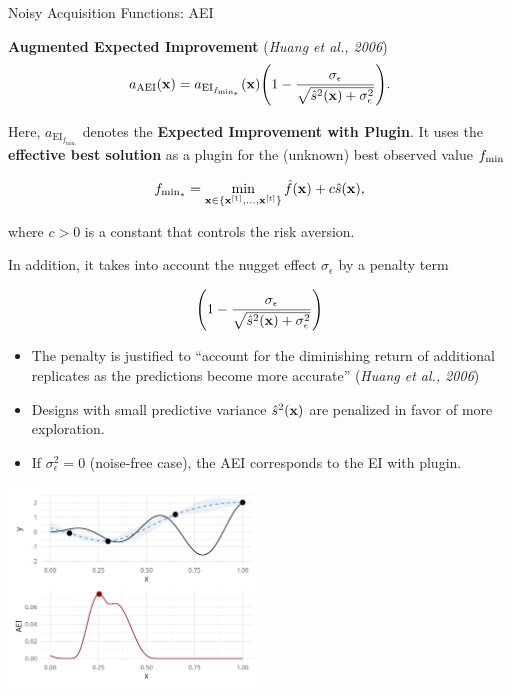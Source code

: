 \documentclass[11pt,compress,t,notes=noshow, xcolor=table]{beamer}
\begin{document}
\begin{vbframe}{Noisy Acquisition Functions: AEI}


\textbf{Augmented Expected Improvement} (\emph{Huang et al., 2006})
$$
  a_{\text{AEI}}(\mathbf{x}) = a_{\text{EI}_{f_{\min_*}}}(\mathbf{x}) \Bigg(1- \frac{\sigma_\epsilon}{\sqrt{\hat{s}^2(\mathbf{x})+ \sigma_\epsilon^2}}\Bigg).
$$

Here, $a_{\text{EI}_{f_{\min_*}}}$ denotes the \textbf{Expected Improvement with Plugin}.
It uses the \textbf{effective best solution} as a plugin for the (unknown) best observed value $f_{\min}$

$$
  f_{\min_*} = \min_{\mathbf{x} \in \{\mathbf{x}^{[1]}, ..., \mathbf{x}^{[t]}\}} \hat{f}(\mathbf{x}) + c \hat{s}(\mathbf{x}),
$$

where $c > 0$ is a constant that controls the risk aversion.


\framebreak

In addition, it takes into account the nugget effect $\sigma_\epsilon$ by a penalty term

$$
  \Bigg(1- \frac{\sigma_\epsilon}{\sqrt{\hat{s}^2(\mathbf{x})+ \sigma_\epsilon^2}}\Bigg)
$$

\begin{itemize}
  \item The penalty is justified to \enquote{account for the diminishing return of additional replicates as the predictions become more accurate} (\emph{Huang et al., 2006})
  \item Designs with small predictive variance $\hat{s}^2(\mathbf{x})$ are penalized in favor of more exploration.
  \item If $\sigma_\epsilon^2 = 0$ (noise-free case), the AEI corresponds to the EI with plugin. 
\end{itemize}

\framebreak

\vspace*{1cm}

\begin{center}
  \includegraphics[width = 0.5\textwidth]{figure_man/noisy_3.png}
\end{center}


\end{vbframe}
\end{document}
